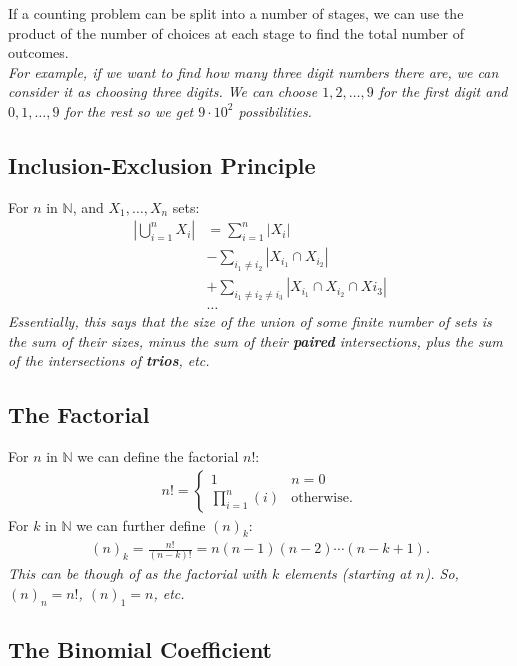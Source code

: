\documentclass[a4paper, 12pt, twoside]{article}
\begin{document}
If a counting problem can be split into a number of stages, we can
use the product of the number of choices at each stage to find
the total number of outcomes.
\\[\baselineskip]
\textit{For example, if we want to find how many three digit numbers 
there are, we can consider it as choosing three digits. We can choose
$1, 2, \ldots, 9$ for the first digit and $0, 1, \ldots, 9$ for 
the rest so we get $9 \cdot 10^2$ possibilities.}

\subsection{Inclusion-Exclusion Principle}

For $n$ in $\mathbb{N}$, and $X_1, \ldots, X_n$ sets: \begin{align*}
  \left|\bigcup_{i = 1}^n X_i\right| &= \sum_{i = 1}^n |X_i| \\
  &-\sum_{i_1 \neq i_2} |X_{i_1} \cap X_{i_2}| \\
  &+\sum_{i_1 \neq i_2 \neq i_3} |X_{i_1} \cap X_{i_2} \cap X{i_3}| \\
  &\ldots
\end{align*} \textit{Essentially, this says that the size of the
union of some finite number of sets is the sum of their sizes,
minus the sum of their \textbf{paired} intersections,
plus the sum of the intersections of \textbf{trios}, etc.}

\subsection{The Factorial}

For $n$ in $\mathbb{N}$ we can define the factorial $n!$: \begin{align*}
  n! = \begin{cases*}
    1 & n = 0 \\
    \prod_{i = 1}^n(i) & \text{otherwise.}
  \end{cases*}
\end{align*} For $k$ in $\mathbb{N}$ we can further define $(n)_k$: \begin{gather*}
  (n)_k = \frac{n!}{(n-k)!} = n(n-1)(n-2)\cdots(n-k+1).
\end{gather*} \textit{This can be though of as the factorial with $k$
elements (starting at $n$). So, $(n)_n = n!$, $(n)_1 = n$, etc.}

\newpage

\subsection{The Binomial Coefficient}
\end{document}
